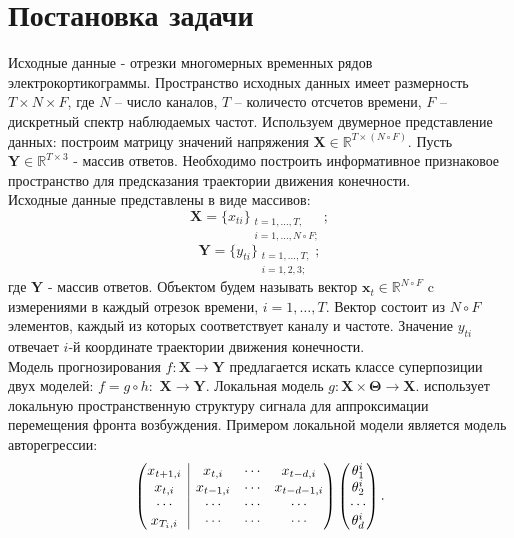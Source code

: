\documentclass[12pt,twoside]{article}
\begin{document}
\section{Постановка задачи}
Исходные данные - отрезки многомерных временных рядов электрокортикограммы. Пространство исходных данных имеет размерность $T \times N \times F$, где $N$ – число каналов, $T$ – количесто отсчетов времени, $F$ – дискретный спектр наблюдаемых частот. Используем двумерное представление данных: построим матрицу значений напряжения $\mathbf{X} \in \mathbb{R}^{T \times (N \circ F)}$. Пусть $\mathbf{Y} \in \mathbb{R}^{T \times 3}$ - массив ответов. Необходимо построить информативное признаковое пространство для предсказания траектории движения конечности. \\
Исходные данные представлены в виде массивов:
\begin{equation}
\mathbf{X} = \{x_{ti}\}_{\substack{t=1,\dots,T,\\ i=1,\dots,N \circ F;}};
\end{equation} 
\begin{equation}
\mathbf{Y} = \{y_{ti}\}_{\substack{t=1,\dots,T,\\ i=1,2,3;}};
\end{equation}
где $\mathbf{Y}$ - массив ответов. Объектом будем называть вектор $\mathbf{x}_t \in \mathbb{R}^{N \circ F}$ c измерениями в каждый отрезок времени, $i = 1,\dots,T$. Вектор состоит из $N\circ F$ элементов, каждый из которых соответствует каналу и частоте. Значение $y_{ti}$ отвечает $i$-й координате траектории движения конечности.\\
Модель прогнозирования $f:\mathbf{X}\to\mathbf{Y}$ предлагается искать классе суперпозиции двух моделей: $f = g \circ h:$ $\mathbf{X}\to\mathbf{Y}$. Локальная модель $g:\mathbf{X}\times\mathbf{\Theta}\to\mathbf{X}$. использует локальную пространственную структуру сигнала для аппроксимации перемещения фронта возбуждения.
 Примером локальной модели является модель авторегрессии:
\begin{equation}
\left(\begin{array}{@{}c|ccc@{}}
x_{t+1,i} & x_{t,i}   & \cdots & x_{t-d,i}   \\
x_{t,i}   & x_{t-1,i} & \cdots & x_{t-d-1,i} \\
\cdots     & \cdots     & \cdots & \cdots	\\
x_{T_{i},i}   & \cdots     & \cdots & \cdots   \\
\end{array}\right)
\begin{pmatrix}
\theta_1^{i} \\
\theta_2^{i} \\
\cdots \\
\theta_d^{i}
\end{pmatrix}.
\end{equation}
\end{document}
